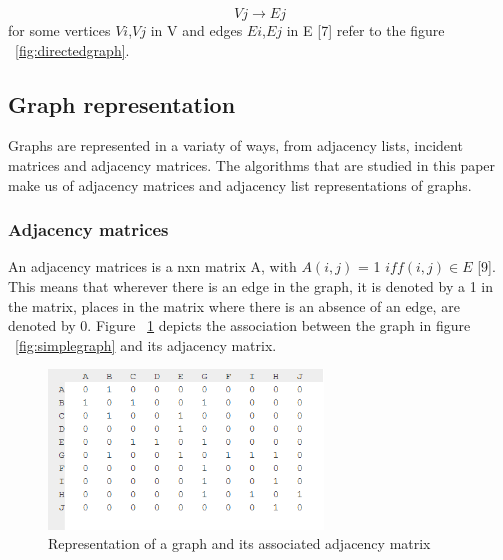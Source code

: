   \begin{equation}
    Vj\rightarrow Ej
  \end{equation} 
   for some vertices $Vi$,$Vj$ in V and edges $Ei$,$Ej$ in E [7] refer to the figure ~\ref{fig:directedgraph}.

\subsection{Graph representation}
Graphs are represented in a variaty of ways, from adjacency lists, incident matrices and adjacency matrices. The algorithms that are studied in this paper make us of adjacency matrices and adjacency list representations of graphs. 

\subsubsection{Adjacency matrices}
An adjacency matrices is a nxn matrix A, with $A(i,j)$ = 1 $iff(i,j) ∈ E$ [9]. This means that wherever there is an edge in the graph, it is denoted by a 1 in the matrix, places in the matrix where there is an absence of an edge, are denoted by 0.\newline\newline
Figure ~\ref{fig:adjacencymatrix} depicts the association between the graph in figure ~\ref{fig:simplegraph} and its adjacency matrix.
\begin{figure}[H]
  \begin{center}
      \includegraphics[width=0.65\textwidth]{matrix.png}
  \end{center}    
  \caption{Representation of a graph and its associated adjacency matrix}
  \label{fig:adjacencymatrix}
\end{figure}

\newpage

